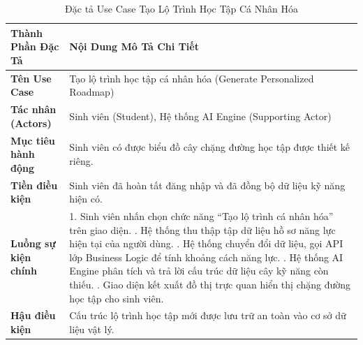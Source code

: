 \begin{table}[H]
	\centering
	\small
	\caption{Đặc tả Use Case Tạo Lộ Trình Học Tập Cá Nhân Hóa}
	\label{tab:spec_usecase}
	\begin{tabular}{|p{3.5cm}|p{11cm}|}
		\hline
		\rowcolor{mainblue} \color{white}\textbf{Thành Phần Đặc Tả} & \color{white}\textbf{Nội Dung Mô Tả Chi Tiết} \\ \hline
		\textbf{Tên Use Case} & Tạo lộ trình học tập cá nhân hóa (Generate Personalized Roadmap) \\ \hline
		\textbf{Tác nhân (Actors)} & Sinh viên (Student), Hệ thống AI Engine (Supporting Actor) \\ \hline
		\textbf{Mục tiêu hành động} & Sinh viên có được biểu đồ cây chặng đường học tập được thiết kế riêng. \\ \hline
		\textbf{Tiền điều kiện} & Sinh viên đã hoàn tất đăng nhập và đã đồng bộ dữ liệu kỹ năng hiện có. \\ \hline
		\textbf{Luồng sự kiện chính} & 
		1. Sinh viên nhấn chọn chức năng ``Tạo lộ trình cá nhân hóa'' trên giao diện. \newline
		2. Hệ thống thu thập tập dữ liệu hồ sơ năng lực hiện tại của người dùng. \newline
		3. Hệ thống chuyển đổi dữ liệu, gọi API lớp Business Logic để tính khoảng cách năng lực. \newline
		4. Hệ thống AI Engine phân tích và trả lời cấu trúc dữ liệu cây kỹ năng còn thiếu. \newline
		5. Giao diện kết xuất đồ thị trực quan hiển thị chặng đường học tập cho sinh viên. \\ \hline
		\textbf{Hậu điều kiện} & Cấu trúc lộ trình học tập mới được lưu trữ an toàn vào cơ sở dữ liệu vật lý. \\ \hline
	\end{tabular}
\end{table}